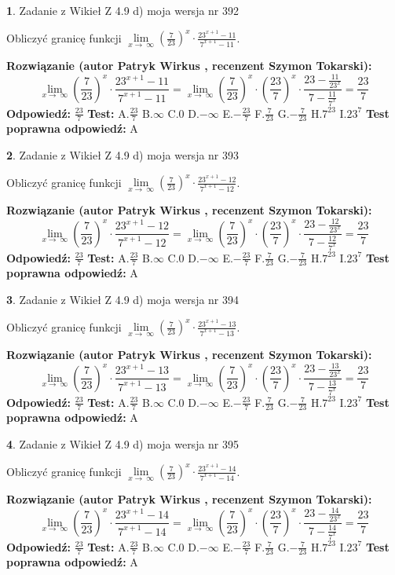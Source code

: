\documentclass[12pt, a4paper]{article}
\theoremstyle{definition} %
\newtheorem{zad}{}
\newcommand{\zadStart}[1]{\begin{zad}#1\newline}
\newcommand{\zadStop}{\end{zad}}
\newcommand{\rozwStart}[2]{\noindent \textbf{Rozwiązanie (autor #1 , recenzent #2): }\newline}
\newcommand{\rozwStop}{\newline}
\newcommand{\odpStart}{\noindent \textbf{Odpowiedź:}\newline}
\newcommand{\odpStop}{\newline}
\newcommand{\testStart}{\noindent \textbf{Test:}\newline}
\newcommand{\testStop}{\newline}
\newcommand{\kluczStart}{\noindent \textbf{Test poprawna odpowiedź:}\newline}
\newcommand{\kluczStop}{\newline}
\begin{document}
\zadStart{Zadanie z Wikieł Z 4.9 d) moja wersja nr 392}


Obliczyć granicę funkcji  $\lim\limits_{x\to\ \infty}(\frac{7}{23})^{x}\cdot\frac{23^{x+1}-11}{7^{x+1}-11}$.
\zadStop
\rozwStart{Patryk Wirkus}{Szymon Tokarski}
$$\lim\limits_{x\to\ \infty}(\frac{7}{23})^{x}\cdot\frac{23^{x+1}-11}{7^{x+1}-11}=\lim\limits_{x\to\ \infty}(\frac{7}{23})^{x}\cdot(\frac{23}{7})^{x} \cdot \frac{23-\frac{11}{23^{x}}}{7-\frac{11}{7^{x}}} = \frac{23}{7}$$
\rozwStop
\odpStart
$\frac{23}{7}$
\odpStop
\testStart
A.$\frac{23}{7}$ B.$\infty$ C.$0$ D.$-\infty$ E.$-\frac{23}{7}$
F.$\frac{7}{23}$ G.$-\frac{7}{23}$
H.$7^{23}$
I.$23^{7}$
\testStop
\kluczStart
A
\kluczStop



\zadStart{Zadanie z Wikieł Z 4.9 d) moja wersja nr 393}


Obliczyć granicę funkcji  $\lim\limits_{x\to\ \infty}(\frac{7}{23})^{x}\cdot\frac{23^{x+1}-12}{7^{x+1}-12}$.
\zadStop
\rozwStart{Patryk Wirkus}{Szymon Tokarski}
$$\lim\limits_{x\to\ \infty}(\frac{7}{23})^{x}\cdot\frac{23^{x+1}-12}{7^{x+1}-12}=\lim\limits_{x\to\ \infty}(\frac{7}{23})^{x}\cdot(\frac{23}{7})^{x} \cdot \frac{23-\frac{12}{23^{x}}}{7-\frac{12}{7^{x}}} = \frac{23}{7}$$
\rozwStop
\odpStart
$\frac{23}{7}$
\odpStop
\testStart
A.$\frac{23}{7}$ B.$\infty$ C.$0$ D.$-\infty$ E.$-\frac{23}{7}$
F.$\frac{7}{23}$ G.$-\frac{7}{23}$
H.$7^{23}$
I.$23^{7}$
\testStop
\kluczStart
A
\kluczStop



\zadStart{Zadanie z Wikieł Z 4.9 d) moja wersja nr 394}


Obliczyć granicę funkcji  $\lim\limits_{x\to\ \infty}(\frac{7}{23})^{x}\cdot\frac{23^{x+1}-13}{7^{x+1}-13}$.
\zadStop
\rozwStart{Patryk Wirkus}{Szymon Tokarski}
$$\lim\limits_{x\to\ \infty}(\frac{7}{23})^{x}\cdot\frac{23^{x+1}-13}{7^{x+1}-13}=\lim\limits_{x\to\ \infty}(\frac{7}{23})^{x}\cdot(\frac{23}{7})^{x} \cdot \frac{23-\frac{13}{23^{x}}}{7-\frac{13}{7^{x}}} = \frac{23}{7}$$
\rozwStop
\odpStart
$\frac{23}{7}$
\odpStop
\testStart
A.$\frac{23}{7}$ B.$\infty$ C.$0$ D.$-\infty$ E.$-\frac{23}{7}$
F.$\frac{7}{23}$ G.$-\frac{7}{23}$
H.$7^{23}$
I.$23^{7}$
\testStop
\kluczStart
A
\kluczStop



\zadStart{Zadanie z Wikieł Z 4.9 d) moja wersja nr 395}


Obliczyć granicę funkcji  $\lim\limits_{x\to\ \infty}(\frac{7}{23})^{x}\cdot\frac{23^{x+1}-14}{7^{x+1}-14}$.
\zadStop
\rozwStart{Patryk Wirkus}{Szymon Tokarski}
$$\lim\limits_{x\to\ \infty}(\frac{7}{23})^{x}\cdot\frac{23^{x+1}-14}{7^{x+1}-14}=\lim\limits_{x\to\ \infty}(\frac{7}{23})^{x}\cdot(\frac{23}{7})^{x} \cdot \frac{23-\frac{14}{23^{x}}}{7-\frac{14}{7^{x}}} = \frac{23}{7}$$
\rozwStop
\odpStart
$\frac{23}{7}$
\odpStop
\testStart
A.$\frac{23}{7}$ B.$\infty$ C.$0$ D.$-\infty$ E.$-\frac{23}{7}$
F.$\frac{7}{23}$ G.$-\frac{7}{23}$
H.$7^{23}$
I.$23^{7}$
\testStop
\kluczStart
A
\kluczStop
\end{document}
